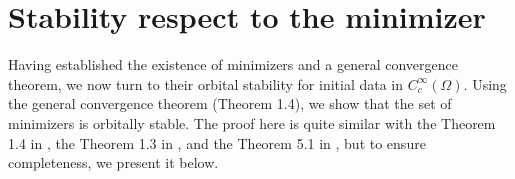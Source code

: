 \documentclass[11pt,letterpaper]{amsart}
\newtheorem{thm}{Theorem}[section]
\theoremstyle{definition}
\theoremstyle{remark}
\newcommand{\D}{\mathcal{D}}
\renewcommand{\S}{\mathcal{S}}
\newcommand{\R}{\mathbb{R}}
\numberwithin{equation}{section}
\begin{document}
\rightline{$\Box$}

\section{Stability respect to the minimizer}\label{sec:stability}

Having established the existence of minimizers and a general convergence theorem, we now turn to their orbital stability for initial data in $C_c^\infty(\Omega)$. Using the general convergence theorem (Theorem 1.4), we show that the set of minimizers is orbitally stable. The proof here is quite similar with the Theorem 1.4 in \cite{abe2022stability}, the Theorem 1.3 in \cite{Abe2025StabilityOL}, and the Theorem 5.1 in \cite{Dong2026StabilityOV}, but to ensure completeness, we present it below.

\hspace*{\fill} 

\end{document}
